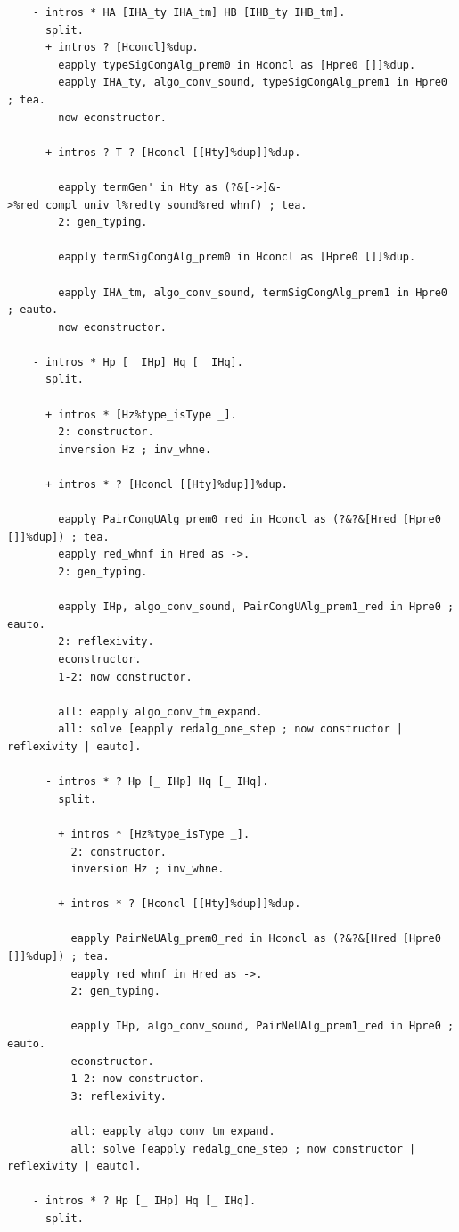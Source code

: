 \begin{lstlisting}
    - intros * HA [IHA_ty IHA_tm] HB [IHB_ty IHB_tm].
      split.
      + intros ? [Hconcl]%dup.
        eapply typeSigCongAlg_prem0 in Hconcl as [Hpre0 []]%dup.
        eapply IHA_ty, algo_conv_sound, typeSigCongAlg_prem1 in Hpre0 ; tea.
        now econstructor.

      + intros ? T ? [Hconcl [[Hty]%dup]]%dup.

        eapply termGen' in Hty as (?&[->]&->%red_compl_univ_l%redty_sound%red_whnf) ; tea.
        2: gen_typing.

        eapply termSigCongAlg_prem0 in Hconcl as [Hpre0 []]%dup.

        eapply IHA_tm, algo_conv_sound, termSigCongAlg_prem1 in Hpre0 ; eauto.
        now econstructor.

    - intros * Hp [_ IHp] Hq [_ IHq].
      split.

      + intros * [Hz%type_isType _].
        2: constructor.
        inversion Hz ; inv_whne.

      + intros * ? [Hconcl [[Hty]%dup]]%dup.

        eapply PairCongUAlg_prem0_red in Hconcl as (?&?&[Hred [Hpre0 []]%dup]) ; tea.
        eapply red_whnf in Hred as ->.
        2: gen_typing.

        eapply IHp, algo_conv_sound, PairCongUAlg_prem1_red in Hpre0 ; eauto.
        2: reflexivity.
        econstructor.
        1-2: now constructor.

        all: eapply algo_conv_tm_expand.
        all: solve [eapply redalg_one_step ; now constructor | reflexivity | eauto].

      - intros * ? Hp [_ IHp] Hq [_ IHq].
        split.
  
        + intros * [Hz%type_isType _].
          2: constructor.
          inversion Hz ; inv_whne.
  
        + intros * ? [Hconcl [[Hty]%dup]]%dup.
  
          eapply PairNeUAlg_prem0_red in Hconcl as (?&?&[Hred [Hpre0 []]%dup]) ; tea.
          eapply red_whnf in Hred as ->.
          2: gen_typing.
  
          eapply IHp, algo_conv_sound, PairNeUAlg_prem1_red in Hpre0 ; eauto.
          econstructor.
          1-2: now constructor.
          3: reflexivity.
  
          all: eapply algo_conv_tm_expand.
          all: solve [eapply redalg_one_step ; now constructor | reflexivity | eauto].

    - intros * ? Hp [_ IHp] Hq [_ IHq].
      split.


\end{lstlisting}
